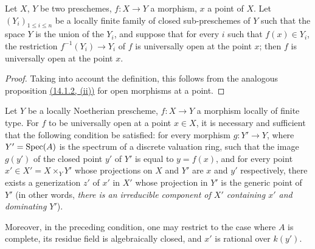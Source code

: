 \begin{proposition}[14.3.5]
\label{IV.14.3.5}
Let $X$, $Y$ be two preschemes, $f:X\to Y$ a morphism, $x$ a point of $X$.
Let $(Y_i)_{1\leq i\leq n}$ be a locally finite family of closed sub-preschemes of $Y$ such that the space $Y$ is the union of the $Y_i$, and suppose that for every $i$ such that $f(x)\in Y_i$, the restriction $f^{-1}(Y_i)\to Y_i$ of $f$ is universally open at the point $x$; then $f$ is universally open at the point $x$.
\end{proposition}

\begin{proof}
Taking into account the definition, this follows from the analogous proposition {\hyperref[IV.14.1.2]{(14.1.2, (ii))}} for open morphisms at a point.
\end{proof}

\begin{proposition}[14.3.6]
\label{IV.14.3.6}
Let $Y$ be a locally Noetherian prescheme, $f:X\to Y$ a morphism locally of finite type.
For $f$ to be universally open at a point $x\in X$, it is necessary and sufficient that the following condition be satisfied: for every morphism $g:Y'\to Y$, where $Y'=\operatorname{Spec}(A)$ is the spectrum of a discrete valuation ring, such that the image $g(y')$ of the closed point $y'$ of $Y'$ is equal to $y=f(x)$, and for every point $x'\in X'=X\times_Y Y'$ whose projections on $X$ and $Y'$ are $x$ and $y'$ respectively, there exists a generization $z'$ of $x'$ in $X'$ whose projection in $Y'$ is the generic point of $Y'$ (in other words, \emph{there is an irreducible component of $X'$ containing $x'$ and dominating $Y'$}).


Moreover, in the preceding condition, one may restrict to the case where $A$ is complete, its residue field is algebraically closed, and $x'$ is rational over $k(y')$.
\end{proposition}

